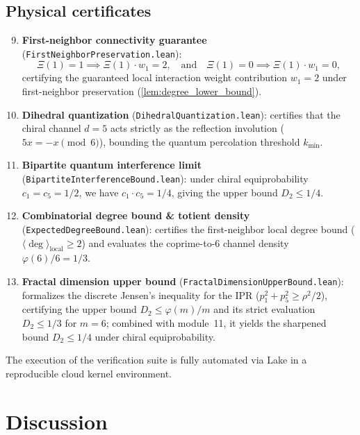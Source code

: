 \documentclass[11pt,a4paper]{article}
\begin{document}
\subsection*{Physical certificates}

\begin{enumerate}
    \setcounter{enumi}{8}
    \item \textbf{First-neighbor connectivity guarantee} (\texttt{FirstNeighborPreservation.lean}):
    \begin{equation}
    \Xi(1) = 1 \implies \Xi(1) \cdot w_1 = 2, \quad \text{and} \quad \Xi(1) = 0 \implies \Xi(1) \cdot w_1 = 0,
    \end{equation}
    certifying the guaranteed local interaction weight contribution $w_1 = 2$ under first-neighbor preservation (\cref{lem:degree_lower_bound}).

    \item \textbf{Dihedral quantization} (\texttt{DihedralQuantization.lean}): certifies that the chiral channel $d=5$ acts strictly as the reflection involution ($5x = -x \pmod 6$), bounding the quantum percolation threshold $k_{\min}$.

    \item \textbf{Bipartite quantum interference limit} (\texttt{BipartiteInterferenceBound.lean}): under chiral equiprobability $c_1 = c_5 = 1/2$, we have $c_1 \cdot c_5 = 1/4$, giving the upper bound $D_2 \le 1/4$.

    \item \textbf{Combinatorial degree bound \& totient density} (\texttt{ExpectedDegreeBound.lean}): certifies the first-neighbor local degree bound ($\langle \deg \rangle_{\text{local}} \ge 2$) and evaluates the coprime-to-6 channel density $\varphi(6)/6 = 1/3$.

    \item \textbf{Fractal dimension upper bound} (\texttt{FractalDimensionUpperBound.lean}): formalizes the discrete Jensen's inequality for the IPR ($p_1^2 + p_5^2 \ge \rho^2/2$), certifying the upper bound $D_2 \le \varphi(m)/m$ and its strict evaluation $D_2 \le 1/3$ for $m=6$; combined with module~11, it yields the sharpened bound $D_2 \le 1/4$ under chiral equiprobability.
\end{enumerate}

The execution of the verification suite is fully automated via Lake in a reproducible cloud kernel environment.

\section{Discussion}
\label{sec:discussion}
\end{document}
